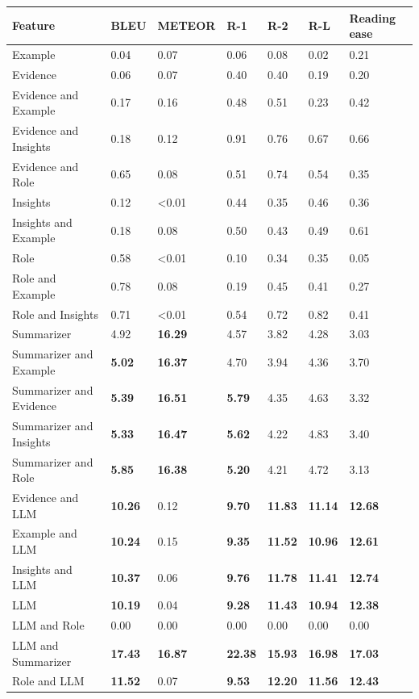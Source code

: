 \begin{tabular}{|l|l|l|l|l|l|l|}
\hline
\textbf{Feature} & BLEU & METEOR & R-1 & R-2 & R-L & Reading ease \\
 \hline
 Example & 0.04 & 0.07 & 0.06 & 0.08 & 0.02 & 0.21 \\
 \hline
 Evidence & 0.06 & 0.07 & 0.40 & 0.40 & 0.19 & 0.20 \\
 \hline
 Evidence and Example & 0.17 & 0.16 & 0.48 & 0.51 & 0.23 & 0.42 \\
 \hline
 Evidence and Insights & 0.18 & 0.12 & 0.91 & 0.76 & 0.67 & 0.66 \\
 \hline
 Evidence and Role & 0.65 & 0.08 & 0.51 & 0.74 & 0.54 & 0.35 \\
 \hline
 Insights & 0.12 & \textless{}0.01 & 0.44 & 0.35 & 0.46 & 0.36 \\
 \hline
 Insights and Example & 0.18 & 0.08 & 0.50 & 0.43 & 0.49 & 0.61 \\
 \hline
 Role & 0.58 & \textless{}0.01 & 0.10 & 0.34 & 0.35 & 0.05 \\
 \hline
 Role and Example & 0.78 & 0.08 & 0.19 & 0.45 & 0.41 & 0.27 \\
 \hline
 Role and Insights & 0.71 & \textless{}0.01 & 0.54 & 0.72 & 0.82 & 0.41 \\
 \hline
 Summarizer & 4.92 & \textbf{16.29} & 4.57 & 3.82 & 4.28 & 3.03 \\
 \hline
 Summarizer and Example & \textbf{5.02} & \textbf{16.37} & 4.70 & 3.94 & 4.36 & 3.70 \\
 \hline
 Summarizer and Evidence & \textbf{5.39} & \textbf{16.51} & \textbf{5.79} & 4.35 & 4.63 & 3.32 \\
 \hline
 Summarizer and Insights & \textbf{5.33} & \textbf{16.47} & \textbf{5.62} & 4.22 & 4.83 & 3.40 \\
 \hline
 Summarizer and Role & \textbf{5.85} & \textbf{16.38} & \textbf{5.20} & 4.21 & 4.72 & 3.13 \\
 \hline
 Evidence and LLM & \textbf{10.26} & 0.12 & \textbf{9.70} & \textbf{11.83} & \textbf{11.14} & \textbf{12.68} \\
 \hline
 Example and LLM & \textbf{10.24} & 0.15 & \textbf{9.35} & \textbf{11.52} & \textbf{10.96} & \textbf{12.61} \\
 \hline
 Insights and LLM & \textbf{10.37} & 0.06 & \textbf{9.76} & \textbf{11.78} & \textbf{11.41} & \textbf{12.74} \\
 \hline
 LLM & \textbf{10.19} & 0.04 & \textbf{9.28} & \textbf{11.43} & \textbf{10.94} & \textbf{12.38} \\
 \hline
 LLM and Role & 0.00 & 0.00 & 0.00 & 0.00 & 0.00 & 0.00 \\
 \hline
 LLM and Summarizer & \textbf{17.43} & \textbf{16.87} & \textbf{22.38} & \textbf{15.93} & \textbf{16.98} & \textbf{17.03} \\
 \hline
 Role and LLM & \textbf{11.52} & 0.07 & \textbf{9.53} & \textbf{12.20} & \textbf{11.56} & \textbf{12.43} \\
\hline
\end{tabular}
